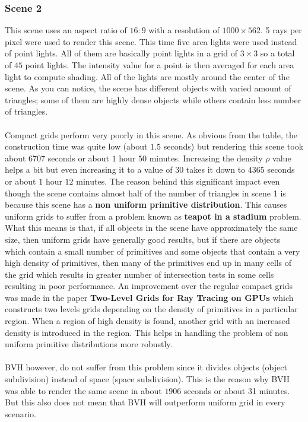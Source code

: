 \documentclass[11pt,a4paper]{article}
\begin{document}
\subsubsection{Scene 2}
This scene uses an aspect ratio of $16:9$ with a resolution of $1000 \times 562$. 5 rays per pixel were used to render this scene. This time five area lights were used instead of point lights. All of them are basically point lights in a grid of $3 \times 3$ so a total of $45$ point lights. The intensity value for a point is then averaged for each area light to compute shading. All of the lights are mostly around the center of the scene. As you can notice, the scene has different objects with varied amount of triangles; some of them are highly dense objects while others contain less number of triangles.
\\~\\
Compact grids perform very poorly in this scene. As obvious from the table, the construction time was quite low (about $1.5$ seconds) but rendering this scene took about $6707$ seconds or about $1$ hour $50$ minutes. Increasing the density $\rho$ value helps a bit but even increasing it to a value of $30$ takes it down to $4365$ seconds or about $1$ hour $12$ minutes. The reason behind this significant impact even though the scene contains almost half of the number of triangles in scene 1 is because this scene has a \textbf{non uniform primitive distribution}. This causes uniform grids to suffer from a problem known as \textbf{teapot in a stadium} \cite{utahteapot} problem. What this means is that, if all objects in the scene have approximately the same size, then uniform grids have generally good results, but if there are objects which contain a small number of primitives and some objects that contain a very high density of primitives, then many of the primitives end up in many cells of the grid which results in greater number of intersection tests in some cells resulting in poor performance. An improvement over the regular compact grids was made in the paper \textbf{Two-Level Grids for Ray Tracing on GPUs} \cite{kalojanov2011two} which constructs two levels grids depending on the density of primitives in a particular region. When a region of high density is found, another grid with an increased density is introduced in the region. This helps in handling the problem of non uniform primitive distributions more robustly.
\\~\\
BVH however, do not suffer from this problem since it divides objects (object subdivision) instead of space (space subdivision). This is the reason why BVH was able to render the same scene in about $1906$ seconds or about 31 minutes. But this also does not mean that BVH will outperform uniform grid in every scenario. 
\end{document}

